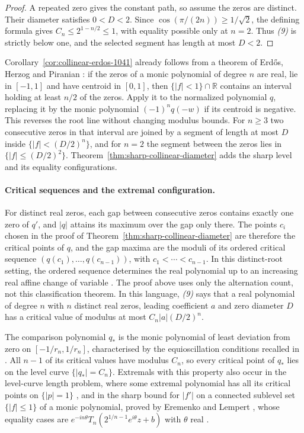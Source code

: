\documentclass[11pt]{article}
\begin{document}
\begin{proof}
A repeated zero gives the constant path, so assume the zeros are distinct.
Their diameter satisfies $0<D<2$. Since
$\cos(\pi/(2n))\ge1/\sqrt2$, the defining formula gives
$C_n\le2^{1-n/2}\le1$, with equality possible only at $n=2$.
Thus \emph{(9)} is strictly below one, and the selected segment has
length at most $D<2$.
\end{proof}

Corollary~\ref{cor:collinear-erdos-1041} already follows from a theorem of
Erd\H{o}s, Herzog and Piranian \cite[Theorem~1, p.~126]{ehp1958}: if the zeros
of a monic polynomial of degree $n$ are real, lie in $[-1,1]$ and have
centroid in $[0,1]$, then $\{|f|<1\}\cap\mathbb R$ contains an interval
holding at least $n/2$ of the zeros.  Apply it to the normalized polynomial
$q$, replacing it by the monic polynomial $(-1)^nq(-w)$ if its centroid
is negative. This reverses the root line without changing modulus bounds. For
$n\ge3$ two consecutive zeros in that interval are joined by a segment of
length at most $D$ inside $\{|f|<(D/2)^n\}$, and for $n=2$ the segment between
the zeros lies in $\{|f|\le(D/2)^2\}$.
Theorem~\ref{thm:sharp-collinear-diameter} adds the sharp level and its
equality configurations.

\paragraph{Critical sequences and the extremal configuration.}
\hypertarget{collinear-source-comparison}{}
For distinct real zeros, each gap between consecutive zeros contains exactly
one zero of $q'$, and $|q|$ attains its maximum over the gap only there.  The
points $c_i$ chosen in the proof of Theorem~\ref{thm:sharp-collinear-diameter}
are therefore the critical points of $q$, and the gap maxima are the moduli of
its ordered critical sequence $(q(c_1),\ldots,q(c_{n-1}))$, with
$c_1<\cdots<c_{n-1}$. In this distinct-root setting, the ordered sequence
determines the real polynomial up to an increasing real affine change
of variable \cite[Theorem~1]{eremenkoyuditskii2012}. The proof above uses
only the alternation count, not this classification theorem.  In this language, \emph{(9)} says that a
real polynomial of degree $n$ with $n$ distinct real zeros, leading
coefficient $a$ and zero diameter $D$ has a critical value of modulus at most
$C_n|a|(D/2)^n$.

The comparison polynomial $q_*$ is the monic polynomial of least deviation
from zero on $[-1/r_n,1/r_n]$, characterised by the equioscillation conditions
recalled in \cite[\S1]{eremenkoyuditskii2012}.  All $n-1$ of its critical
values have modulus $C_n$, so every critical point of $q_*$ lies on the level
curve $\{|q_*|=C_n\}$.  Extremals with this property also occur in the
level-curve length problem, where some extremal polynomial has all its
critical points on $\{|p|=1\}$ \cite[Lemma~5]{eremenkohayman1999}, and in the
sharp bound for $|f'|$ on a connected sublevel set $\{|f|\le1\}$ of a monic
polynomial, proved by Eremenko and Lempert
\cite[Theorem~1]{eremenkolempert1994}, whose
equality cases are $e^{-in\theta}T_n(2^{1/n-1}e^{i\theta}z+b)$ with $\theta$
real \cite[Theorem~A]{eremenko2007}.
\end{document}
